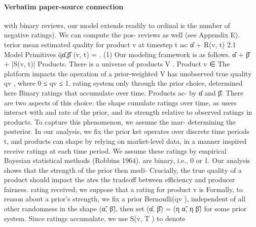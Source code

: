 \documentclass[10pt]{article}
\begin{document}
\paragraph{Verbatim paper-source connection}
\begin{ReviewVerbatim}
with binary reviews, our model extends readily to ordinal                       is the number of negative ratings). We can compute the pos-
reviews as well (see Appendix E).                                               terior mean estimated quality for product v at timestep t as:
                                                                                                                    α̂ + R(v, t)
2.1    Model Primitives                                                                       q̂α̂,β̂ (v, t) =                         .   (1)
Our modeling framework is as follows.                                                                            α̂ + β̂ + |S(v, t)|
   Products. There is a universe of products V . Product v ∈                       The platform impacts the operation of a prior-weighted
V has unobserved true quality qv , where 0 ≤ qv ≤ 1.                            rating system only through the prior choice, determined here
   Binary ratings that accumulate over time. Products ac-                       by α̂ and β̂. There are two aspects of this choice: the shape
cumulate ratings over time, as users interact with and rate                     of the prior, and its strength relative to observed ratings in
products. To capture this phenomenon, we assume the mar-                        determining the posterior. In our analysis, we fix the prior
ket operates over discrete time periods t, and products can                     shape by relying on market-level data, in a manner inspired
receive ratings at each time period. We assume these ratings                    by empirical Bayesian statistical methods (Robbins 1964).
are binary, i.e., 0 or 1.                                                       Our analysis shows that the strength of the prior then medi-
   Crucially, the true quality of a product should impact the                   ates the tradeoff between efficiency and producer fairness.
rating received; we suppose that a rating for product v is                         Formally, to reason about a prior’s strength, we fix a prior
Bernoulli(qv ), independent of all other randomness in the
                                                                                shape (α̃, β̃), then set (α̂, β̂) = (η α̃, η β̃) for some prior
system. Since ratings accumulate, we use S(v, T ) to denote

\end{ReviewVerbatim}
\end{document}
